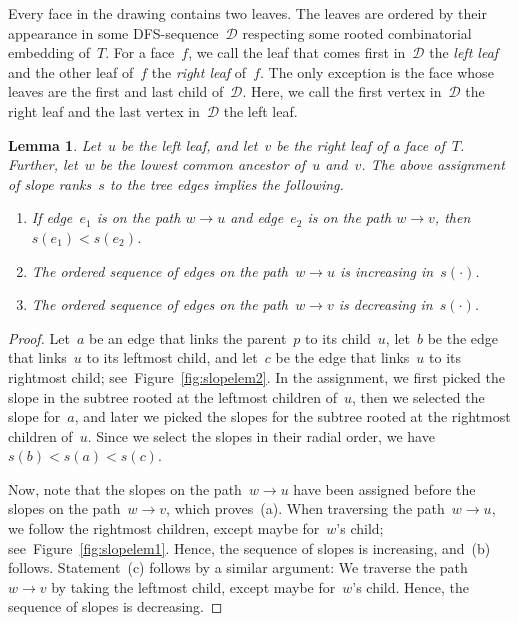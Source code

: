 \documentclass[a4paper,11pt]{article}
\theoremstyle{plain}
\newtheorem{lemma}{Lemma}
\begin{document}
Every face in the drawing contains two leaves. The leaves are ordered by 
their appearance in some DFS-sequence~$\mathcal{D}$ respecting some rooted 
combinatorial embedding of~$T$. For a face~$f$, we call the leaf that comes 
first in~$\mathcal{D}$ the \emph{left leaf} and the other leaf of~$f$  the 
\emph{right leaf} of~$f$. The only exception is the face whose leaves are the 
first and last child of~$\mathcal{D}$. Here, we call the first vertex 
in~$\mathcal{D}$ the right leaf and the last vertex in~$\mathcal{D}$ the left 
leaf.

\begin{lemma}\label{lem:inc_slopes}
  Let~$u$ be the left leaf, and let~$v$ be the right leaf of a face of~$T$. 
  Further, let~$w$ be the lowest common ancestor of~$u$ and~$v$. The above assignment 
  of slope ranks~$s$ to the tree edges implies the following.
  \begin{enumerate}[label=(a)]
		\item If edge~$e_1$ is on the path $w\to u$
			and edge~$e_2$ is on the path $w\to v$,
			then $s(e_1)<s(e_2)$.
		\item The ordered sequence of edges on the path~$w\to u$ is increasing in~$s(\cdot)$.
		\item The ordered sequence of edges on the path~$w\to v$ is decreasing in~$s(\cdot)$.
  \end{enumerate}
\end{lemma}

\begin{proof}
  Let~$a$ be an edge that links the parent~$p$ to its child~$u$, 
  let~$b$ be the edge that links~$u$ to its leftmost child, and let~$c$ be
  the edge that links~$u$ to its rightmost child;
  see~Figure~\ref{fig:slopelem2}. In the assignment, we first picked
  the slope in the subtree rooted at the leftmost children of~$u$,
  then we selected the slope for~$a$, and later we picked the slopes
  for the subtree rooted at the rightmost children of~$u$. Since we
  select the slopes in their radial order, we have $s(b)< s(a) < s(c)$.

  Now, note that the slopes on the path~$w\to u$ have been assigned
  before the slopes on the path~$w\to v$, which proves~(a).  When
  traversing the path~$w\to u$, we follow the rightmost children,
  except maybe for~$w$'s child; see~Figure~\ref{fig:slopelem1}. Hence,
  the sequence of slopes is increasing, and~(b) follows. Statement~(c)
  follows by a similar argument: We traverse the path~$w\to v$ by
  taking the leftmost child, except maybe for~$w$'s child.  Hence, the
  sequence of slopes is decreasing.
\end{proof}
\end{document}
